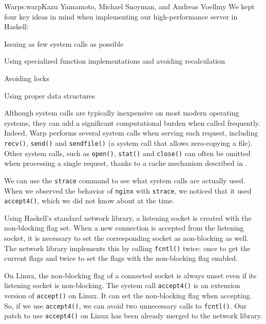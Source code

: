 \begin{aosachapter}{Warp}{s:warp}{Kazu Yamamoto, Michael Snoyman, and Andreas Voellmy}
We kept four key ideas in mind when implementing our high-performance
server in Haskell:

\begin{aosaenumerate}
\def\labelenumi{\arabic{enumi}.}

\item
  Issuing as few system calls as possible
\item
  Using specialized function implementations and avoiding recalculation
\item
  Avoiding locks
\item
  Using proper data structures
\end{aosaenumerate}


Although system calls are typically inexpensive on most modern operating
systems, they can add a significant computational burden when called
frequently. Indeed, Warp performs several system calls when serving each
request, including \texttt{recv()}, \texttt{send()} and
\texttt{sendfile()} (a system call that allows zero-copying a file).
Other system calls, such as \texttt{open()}, \texttt{stat()} and
\texttt{close()} can often be omitted when processing a single request,
thanks to a cache mechanism described in .

We can use the \texttt{strace} command to see what system calls are
actually used. When we observed the behavior of \texttt{nginx} with
\texttt{strace}, we noticed that it used \texttt{accept4()}, which we
did not know about at the time.

Using Haskell's standard network library, a listening socket is created
with the non-blocking flag set. When a new connection is accepted from
the listening socket, it is necessary to set the corresponding socket as
non-blocking as well. The network library implements this by calling
\texttt{fcntl()} twice: once to get the current flags and twice to set
the flags with the non-blocking flag enabled.

On Linux, the non-blocking flag of a connected socket is always unset
even if its listening socket is non-blocking. The system call
\texttt{accept4()} is an extension version of \texttt{accept()} on
Linux. It can set the non-blocking flag when accepting. So, if we use
\texttt{accept4()}, we can avoid two unnecessary calls to
\texttt{fcntl()}. Our patch to use \texttt{accept4()} on Linux has been
already merged to the network library.



\end{aosachapter}
